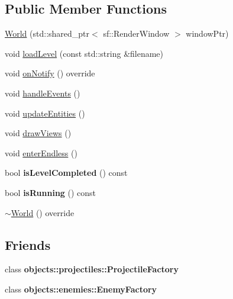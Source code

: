 \subsection*{Public Member Functions}
\begin{DoxyCompactItemize}
\item 
\hyperlink{classWorld_a96ca734b18df2cf85e666fc6d358e12c}{World} (std\+::shared\+\_\+ptr$<$ sf\+::\+Render\+Window $>$ window\+Ptr)
\item 
void \hyperlink{classWorld_a6a08c827c3a0def12b7700211353735f}{load\+Level} (const std\+::string \&filename)
\item 
void \hyperlink{classWorld_a91c2d7b127190f17a6cd85743245fb5b}{on\+Notify} () override
\item 
void \hyperlink{classWorld_ad37fe32cce284282361b9e7397b27a23}{handle\+Events} ()
\item 
void \hyperlink{classWorld_a5cc73b1aa54db5da01e4004acd4fd8bb}{update\+Entities} ()
\item 
void \hyperlink{classWorld_a8e8ad60668f8fe975f03bcb612264bc4}{draw\+Views} ()
\item 
void \hyperlink{classWorld_a04f39f13be0b568122bc8a539c15f014}{enter\+Endless} ()
\item 
\mbox{\label{classWorld_a89826be651c0ea4c8965403cd0b8138c}} 
bool {\bfseries is\+Level\+Completed} () const
\item 
\mbox{\label{classWorld_a6ec812e86ad7813ff1a2c92ea6d85824}} 
bool {\bfseries is\+Running} () const
\item 
\hyperlink{classWorld_adf5e8724afb4d083e566ee4e48905bf2}{$\sim$\+World} () override
\end{DoxyCompactItemize}
\subsection*{Friends}
\begin{DoxyCompactItemize}
\item 
\mbox{\label{classWorld_aae9c9276ab438e27ef024f7abcc0aae1}} 
class {\bfseries objects\+::projectiles\+::\+Projectile\+Factory}
\item 
\mbox{\label{classWorld_adaaabeba89709afe432b11382c698e23}} 
class {\bfseries objects\+::enemies\+::\+Enemy\+Factory}
\end{DoxyCompactItemize}


